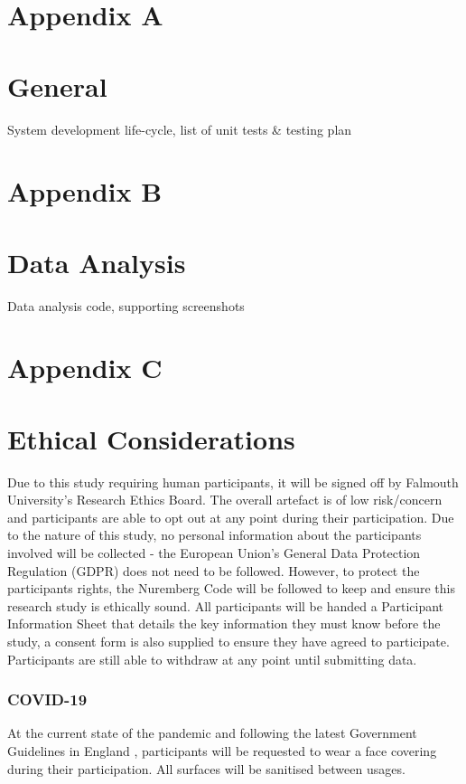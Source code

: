 \section*{Appendix A}
\section*{General}
\label{append:a}
System development life-cycle, list of unit tests \& testing plan

\section*{Appendix B}
\section*{Data Analysis}
\label{append:b}
Data analysis code, supporting screenshots

\section*{Appendix C}
\section*{Ethical Considerations}
\label{append:c}

Due to this study requiring human participants, it will be signed off by Falmouth University's Research Ethics Board. The overall artefact is of low risk/concern and participants are able to opt out at any point during their participation.
Due to the nature of this study, no personal information about the participants involved will be collected - the European Union's General Data Protection Regulation (GDPR)\cite{gdpr} does not need to be followed. However, to protect the participants rights, the Nuremberg Code will be followed to keep and ensure this research study is ethically sound\cite{nuremberg-code}. All participants will be handed a Participant Information Sheet that details the key information they must know before the study, a consent form is also supplied to ensure they have agreed to participate. Participants are still able to withdraw at any point until submitting data.
\subsubsection*{COVID-19}
At the current state of the pandemic and following the latest Government Guidelines in England \cite{gov-guidlines}, participants will be requested to wear a face covering during their participation. All surfaces will be sanitised between usages.

